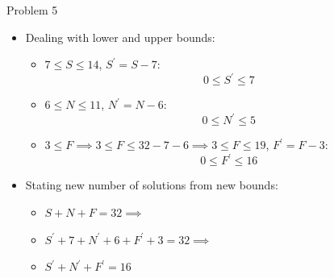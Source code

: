 \documentclass{beamer}
\begin{document}
\begin{frame}{Problem 5}
    \begin{itemize} 
        \item Dealing with lower and upper bounds:
        \begin{itemize}
            \item   $7 \leq S \leq 14$, $S^{'} = S - 7$:
                    $$0 \leq S^{'} \leq 7$$
            \item   $6 \leq N \leq 11$, $N^{'} = N - 6$: 
                    $$0 \leq N^{'} \leq 5$$
            \item   $3 \leq F \implies 3 \leq F \leq 32 - 7 - 6 \implies 3 \leq F \leq 19$, $F^{'} = F - 3$:
                    $$0 \leq F^{'} \leq 16$$
        \end{itemize}
        \item Stating new number of solutions from new bounds:
        \begin{itemize}
            \item $S + N + F = 32 \implies $
            \item $S^{'} + 7 + N^{'} + 6 + F^{'} + 3 = 32 \implies $
            \item $S^{'} + N^{'} + F^{'} = 16$
        \end{itemize}
    \end{itemize}
\end{frame}
\end{document}
